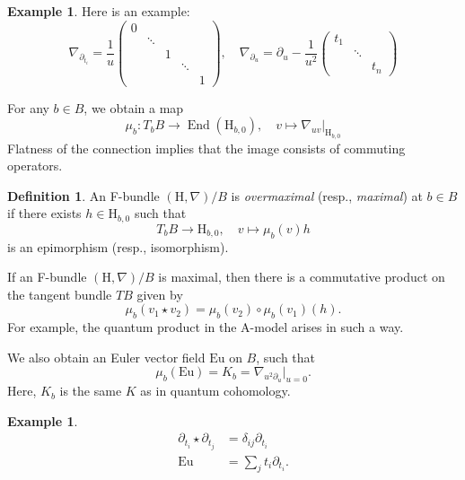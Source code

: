 \documentclass[11pt, reqno]{amsart}
\numberwithin{equation}{section}
\theoremstyle{plain}
\theoremstyle{definition}
\newtheorem{definition}[theorem]{Definition}
\newtheorem{example}[theorem]{Example}
\theoremstyle{italicsname}
\DeclareMathOperator{\End}{End}
\newcommand{\rH}{\mathrm{H}}
\newcommand{\euler}{\mathrm{Eu}}
\begin{document}
\begin{example}
Here is an example:
    \begin{equation*}
        \nabla_{\partial_{t_i}} = \frac{1}{u} \begin{pmatrix}
            0 \\
            & \ddots \\
            & & 1 \\
            & & & \ddots \\
            & & & & 1
        \end{pmatrix}, \quad \nabla_{\partial_u} = \partial_u - \frac{1}{u^2} \begin{pmatrix}
            t_1 \\
            & \ddots \\
            & & t_n
        \end{pmatrix}
    \end{equation*}
\end{example}

For any $b \in B$, we obtain a map
\begin{equation*}
    \mu_b:T_b B \to \End(\rH_{b, 0}), \quad v \mapsto \nabla_{uv}|_{\rH_{b, 0}}
\end{equation*}
Flatness of the connection implies that the image consists of commuting operators. 

\begin{definition}
\label{def:overmaximal}
    An F-bundle $(\rH, \nabla)/B$ is \emph{overmaximal} (resp., \emph{maximal}) at $b \in B$ if there exists $h \in \rH_{b, 0}$ such that 
    \[
        T_b B \to \rH_{b, 0}, \quad v \mapsto \mu_b(v)h
    \]
    is an epimorphism (resp., isomorphism).
\end{definition}

If an F-bundle $(\rH, \nabla)/B$ is maximal, then there is a commutative product on the tangent bundle $TB$ given by
\[
    \mu_b(v_1 \star v_2) = \mu_b(v_2) \circ \mu_b(v_1)(h).
\]
For example, the quantum product in the A-model arises in such a way. 

We also obtain an Euler vector field $\euler$ on $B$, such that 
\[
    \mu_b(\euler) = K_b = \nabla_{u^2 \partial_u}|_{u = 0}.
\]
Here, $K_b$ is the same $K$ as in quantum cohomology.

\begin{example}
\begin{align*}
    \partial_{t_i} \star \partial_{t_j} &= \delta_{ij} \partial_{t_i} \\
    \euler &= \sum_j t_i \partial_{t_i}.
\end{align*}
\end{example}
\end{document}
